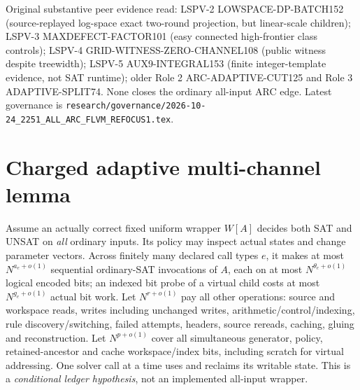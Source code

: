 \documentclass[11pt]{article}
\begin{document}
Original substantive peer evidence read: LSPV-2 LOWSPACE-DP-BATCH152 (source-replayed log-space exact two-round projection, but linear-scale children); LSPV-3 MAXDEFECT-FACTOR101 (easy connected high-frontier class controls); LSPV-4 GRID-WITNESS-ZERO-CHANNEL108 (public witness despite treewidth); LSPV-5 AUX9-INTEGRAL153 (finite integer-template evidence, not SAT runtime); older Role 2 ARC-ADAPTIVE-CUT125 and Role 3 ADAPTIVE-SPLIT74. None closes the ordinary all-input ARC edge. Latest governance is \texttt{research/governance/2026-10-24\_2251\_ALL\_ARC\_FLVM\_REFOCUS1.tex}.

\section{Charged adaptive multi-channel lemma}
Assume an actually correct fixed uniform wrapper $W[A]$ decides both SAT and UNSAT on \emph{all} ordinary inputs. Its policy may inspect actual states and change parameter vectors. Across finitely many declared call types $e$, it makes at most $N^{a_e+o(1)}$ sequential ordinary-SAT invocations of $A$, each on at most $N^{\theta_e+o(1)}$ logical encoded bits; an indexed bit probe of a virtual child costs at most $N^{g_e+o(1)}$ actual bit work. Let $N^{r+o(1)}$ pay all other operations: source and workspace reads, writes including unchanged writes, arithmetic/control/indexing, rule discovery/switching, failed attempts, headers, source rereads, caching, gluing and reconstruction. Let $N^{p+o(1)}$ cover all simultaneous generator, policy, retained-ancestor and cache workspace/index bits, including scratch for virtual addressing. One solver call at a time uses and reclaims its writable state. This is a \emph{conditional ledger hypothesis}, not an implemented all-input wrapper.
\end{document}
